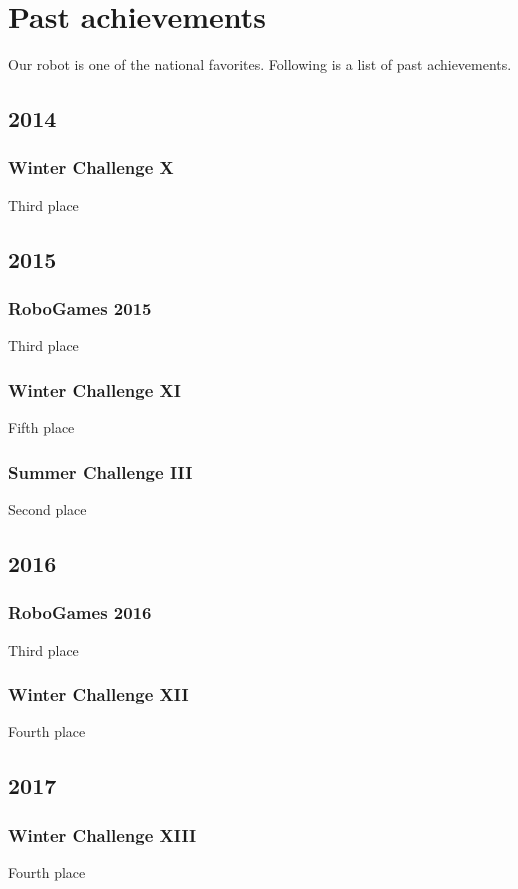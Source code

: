 \documentclass[conference]{IEEEtran}
\begin{document}
\section{Past achievements} \label{past-achievements}
Our robot is one of the national favorites. Following is a list of past achievements.

\subsection*{2014}
\setcounter{subsubsection}{0}
\subsubsection{Winter Challenge X} Third place
\subsection*{2015}
\setcounter{subsubsection}{0}
\subsubsection{RoboGames 2015} Third place
\subsubsection{Winter Challenge XI} Fifth place
\subsubsection{Summer Challenge III} Second place
\subsection*{2016}
\setcounter{subsubsection}{0}
\subsubsection{RoboGames 2016} Third place
\subsubsection{Winter Challenge XII} Fourth place
\subsection*{2017}
\setcounter{subsubsection}{0}
\subsubsection{Winter Challenge XIII} Fourth place
\end{document}
